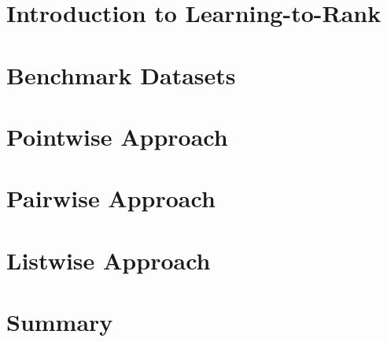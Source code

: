 \chapter{Introduction to Learning-to-Rank}
\chapter{Benchmark Datasets}
\chapter{Pointwise Approach}
\chapter{Pairwise Approach}
\chapter{Listwise Approach}
\chapter{Summary}